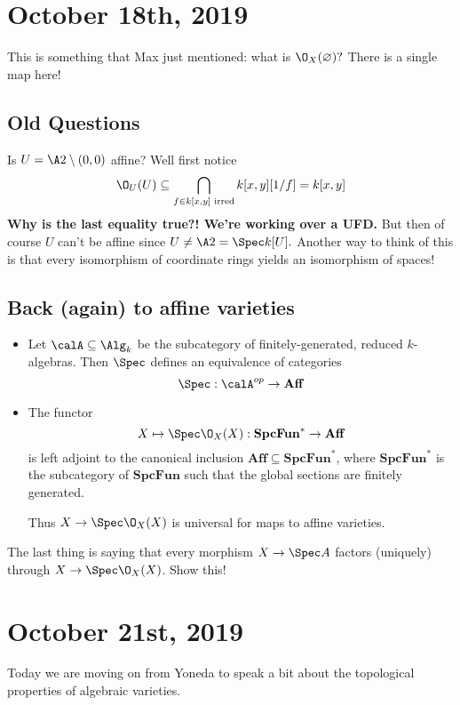 \documentclass[12pt]{article}
\newcommand{\SpcFun}{\mathbf{SpcFun}}
\begin{document}
\section{October 18th, 2019}
This is something that Max just mentioned: what is $\O_X(\varnothing)?$ There is a single map here! 

\subsection{Old Questions}
Is $U=\A2\setminus (0,0)$ affine? Well first notice 
\[\O_{U}(U)\subseteq \bigcap_{f\in k[x,y]\text{ irred}}k[x,y][1/f]=k[x,y]\]
\textbf{Why is the last equality true?! We're working over a UFD.} But then of course 
$U$ can't be affine since $U\ne \A2=\Spec k[U].$ Another way to think of this is that every isomorphism of 
coordinate rings yields an isomorphism of spaces!

\subsection{Back (again) to affine varieties}
\begin{thm}
	\begin{itemize}
		\item Let $\calA\subseteq\Alg_k$ be the subcategory of finitely-generated, reduced $k$-algebras. Then $\Spec$ defines an equivalence of categories
		\[\Spec:\calA^{op}\to \mathbf{Aff}\]
		\item The functor
		\[X\mapsto\Spec \O_X(X):\SpcFun^\ast\to\mathbf{Aff}\]
		is left adjoint to the canonical inclusion $\mathbf{Aff}\subseteq\SpcFun^\ast$, where $\SpcFun^\ast$
		is the subcategory of $\SpcFun$ such that the global sections are finitely generated.

		Thus $X\to\Spec \O_X(X)$ is universal for maps to affine varieties.
	\end{itemize}	
\end{thm}
\begin{prob}
	The last thing is saying that every morphism $X\to \Spec A$ factors (uniquely) through $X\to\Spec \O_X(X)$. Show this!
\end{prob}

\section{October 21st, 2019}
Today we are moving on from Yoneda to speak a bit about the topological properties of algebraic varieties.
\end{document}
